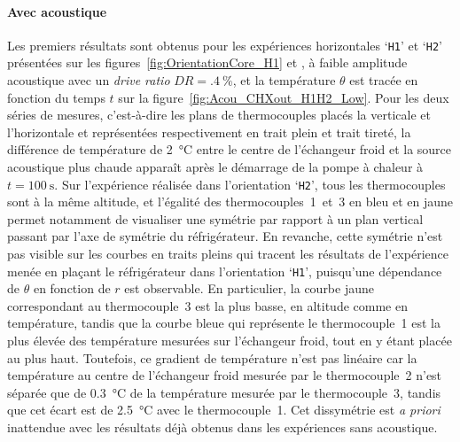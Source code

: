\paragraph{Avec acoustique}\label{chap:Acou_CHXout_H1H2_low}
Les premiers résultats sont obtenus pour les expériences horizontales `\texttt{H1}' et `\texttt{H2}' présentées sur les figures~\ref{fig:OrientationCore_H1} et , à faible amplitude acoustique avec un \textit{drive ratio} $DR=\qty{.4}{\percent}$, et la température $\theta$ est tracée en fonction du temps $t$ sur la figure~\ref{fig:Acou_CHXout_H1H2_Low}. Pour les deux séries de mesures, c'est-à-dire les plans de thermocouples placés la verticale et l'horizontale et représentées respectivement en trait plein et trait tireté, la différence de température de \qty{2}{\degreeCelsius} entre le centre de l'échangeur froid et la source acoustique plus chaude apparaît après le démarrage de la pompe à chaleur à $t=\qty{100}{\second}$. Sur l'expérience réalisée dans l'orientation `\texttt{H2}', tous les thermocouples sont à la même altitude, et l'égalité des thermocouples~1~et~3 en bleu et en jaune permet notamment de visualiser une symétrie par rapport à un plan vertical passant par l'axe de symétrie du réfrigérateur. En revanche, cette symétrie n'est pas visible sur les courbes en traits pleins qui tracent les résultats de l'expérience menée en plaçant le réfrigérateur dans l'orientation `\texttt{H1}', puisqu'une dépendance de $\theta$ en fonction de $r$ est observable. En particulier, la courbe jaune correspondant au thermocouple~3 est la plus basse, en altitude comme en température, tandis que la courbe bleue qui représente le thermocouple~1 est la plus élevée des température mesurées sur l'échangeur froid, tout en y étant placée au plus haut. Toutefois, ce gradient de température n'est pas linéaire car la température au centre de l'échangeur froid mesurée par le thermocouple~2 n'est séparée que de \qty{.3}{\degreeCelsius} de la température mesurée par le thermocouple~3, tandis que cet écart est de \qty{2.5}{\degreeCelsius} avec le thermocouple~1. Cet dissymétrie est \textit{a priori} inattendue avec les résultats déjà obtenus dans les expériences sans acoustique.
\smallskip

